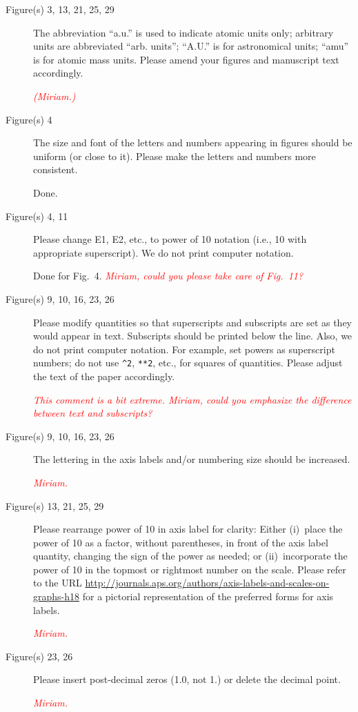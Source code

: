 \documentclass[aps
,prstab
,preprint,tightenlines
,amsfonts,amssymb,amsmath
]{revtex4-1}
\newcommand{\note}[1]{\emph{\textcolor{red}{#1}}} %
\newenvironment{co}{\em}{}
\newcommand{\bco}{\begin{co}}
\newcommand{\eco}{\end{co}}
\newenvironment{re}{\color{NavyBlue}}{}
\newcommand{\bre}{\begin{re}}
\newcommand{\ere}{\end{re}}
\begin{document}
\begin{description}

\bco
\item[Figure(s) 3, 13, 21, 25, 29] The abbreviation ``a.u.'' is used
  to indicate atomic units only; arbitrary units are abbreviated
  ``arb.  units''; ``A.U.'' is for astronomical units; ``amu'' is for
  atomic mass units.  Please amend your figures and manuscript text
  accordingly.
\eco

\note{(Miriam.)}

\bco
\item[Figure(s) 4] The size and font of the letters and numbers
  appearing in figures should be uniform (or close to it).  Please
  make the letters and numbers more consistent.
\eco

\bre Done.\ere

\bco
\item[Figure(s) 4, 11] Please change E1, E2, etc., to power of 10
  notation (i.e., 10 with appropriate superscript).  We do not print
  computer notation.
\eco

\bre Done for Fig.~4. \ere \note{Miriam, could you please take care of Fig.~11?}

\bco
\item[Figure(s) 9, 10, 16, 23, 26] Please modify quantities so that
  superscripts and subscripts are set as they would appear in
  text. Subscripts should be printed below the line. Also, we do not
  print computer notation. For example, set powers as superscript
  numbers; do not use \verb!^2!, \verb!**2!, etc., for squares of
  quantities. Please adjust the text of the paper accordingly.
\eco

\note{This comment is a bit extreme. Miriam, could you emphasize the
  difference between text and subscripts?}

\bco
\item[Figure(s) 9, 10, 16, 23, 26] The lettering in the axis labels
  and/or numbering size should be increased.
\eco

\note{Miriam.}

\bco
\item[Figure(s) 13, 21, 25, 29] Please rearrange power of 10 in axis
  label for clarity: Either (i)~place the power of 10 as a factor,
  without parentheses, in front of the axis label quantity, changing
  the sign of the power as needed; or (ii)~incorporate the power of 10
  in the topmost or rightmost number on the scale.  Please refer to
  the URL
  \url{http://journals.aps.org/authors/axis-labels-and-scales-on-graphs-h18}
  for a pictorial representation of the preferred forms for axis
  labels.
\eco

\note{Miriam.}

\bco
\item[Figure(s) 23, 26] Please insert post-decimal zeros (1.0, not 1.)
  or delete the decimal point.
\eco

\note{Miriam.}

\end{description}
\end{document}
